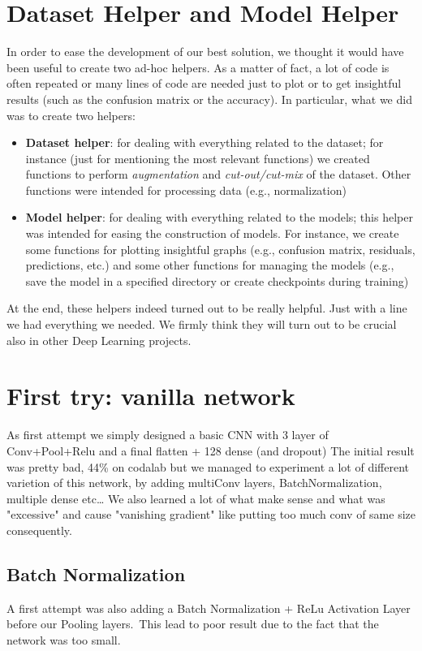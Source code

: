 \documentclass[10pt]{article}
\begin{document}
\section{Dataset Helper and Model Helper}
In order to ease the development of our best solution, we thought it would have been useful to create two ad-hoc helpers. As a matter of fact, a lot of code is often repeated or many lines of code are needed just to plot or to get insightful results (such as the confusion matrix or the accuracy). In particular, what we did was to create two helpers:
\begin{itemize}
    \item \textbf{Dataset helper}: for dealing with everything related to the dataset; for instance (just for mentioning the most relevant functions) we created functions to perform \textit{augmentation} and \textit{cut-out/cut-mix} of the dataset. Other functions were intended for processing data (e.g., normalization)
    \item \textbf{Model helper}: for dealing with everything related to the models; this helper was intended for easing the construction of models. For instance, we create some functions for plotting insightful graphs (e.g., confusion matrix, residuals, predictions, etc.) and some other functions for managing the models (e.g., save the model in a specified directory or create checkpoints during training)
\end{itemize}
At the end, these helpers indeed turned out to be really helpful. Just with a line we had everything we needed. We firmly think they will turn out to be crucial also in other Deep Learning projects.

\section{First try: vanilla network}
As first attempt we simply designed a basic CNN with 3 layer of Conv+Pool+Relu and a final flatten + 128 dense (and dropout)
The initial result was pretty bad, 44\% on codalab but we managed to experiment a lot of different varietion of this network, by adding multiConv layers, BatchNormalization, multiple dense etc\dots
We also learned a lot of what make sense and what was "excessive" and cause "vanishing gradient" like putting too much conv of same size consequently.
\subsection{Batch Normalization}
A first attempt was also adding a Batch Normalization + ReLu Activation Layer before our Pooling layers.\
This lead to poor result due to the fact that the network was too small.
\end{document}

